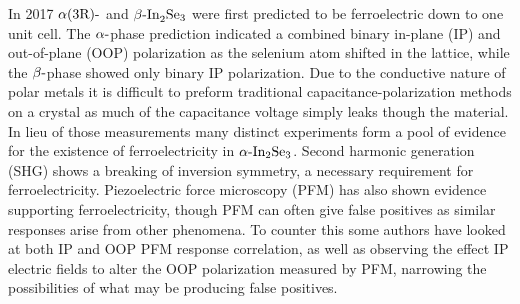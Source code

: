 In 2017 $\textrm{\ensuremath{\alpha}(3R)-}$ and $\textrm{\ensuremath{\beta}-In}_{2}\textrm{Se}_{3}$
were first predicted to be ferroelectric down to one unit cell.\citep{ding2017prediction}
The $\textrm{\ensuremath{\alpha}-}$phase prediction indicated a combined
binary in-plane (IP) and out-of-plane (OOP) polarization as the selenium
atom shifted in the lattice, while the $\textrm{\ensuremath{\beta}-}$phase
showed only binary IP polarization. Due to the conductive nature of
polar metals it is difficult to preform traditional capacitance-polarization
methods on a crystal as much of the capacitance voltage simply leaks
though the material. In lieu of those measurements many distinct experiments
form a pool of evidence for the existence of ferroelectricity in $\textrm{\ensuremath{\alpha}-In}_{2}\textrm{Se}_{3}$.
Second harmonic generation (SHG) shows a breaking of inversion symmetry\citep{dai2020intrinsic,xiao2018intrinsic,zhou2017outofplane},
a necessary requirement for ferroelectricity. Piezoelectric force
microscopy (PFM) has also shown evidence supporting ferroelectricity\citep{cui2018intercorrelated,wan2018roomtemperature,hou2019resistive,dai2020intrinsic,hou2019ain2se3},
though PFM can often give false positives as similar responses arise
from other phenomena.\citep{vasudevan2017ferroelectric} To counter
this some authors have looked at both IP and OOP PFM response correlation\citep{dai2020intrinsic,hou2019resistive,xiao2018intrinsic,cui2018intercorrelated,liu2019atomically,hou2019ain2se3},
as well as observing the effect IP electric fields to alter the OOP
polarization measured by PFM\citep{hou2019ain2se3}, narrowing the
possibilities of what may be producing false positives.


